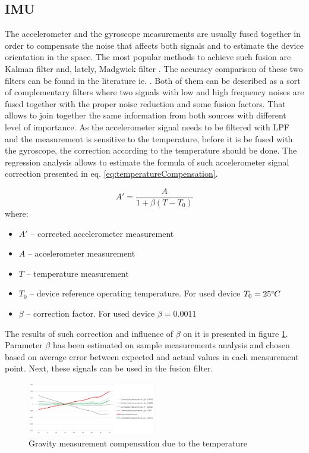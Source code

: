 \documentclass{llncs}
\begin{document}
\subsection{IMU}
The accelerometer and the gyroscope measurements are usually fused together in order to compensate the noise that affects both signals and to estimate the device orientation in the space. The most popular methods to achieve such fusion are Kalman filter \cite{Mccarron2013,Caron2006} and, lately, Madgwick filter \cite{Kalkbrenner2014}. The accuracy comparison of these two filters can be found in the literature ie. \cite{Madgwick2010}. Both of them can be described as a sort of complementary filters where two signals with low and high frequency noises are fused together with the proper noise reduction and some fusion factors. That allows to join together the same information from both sources with different level of importance. As the accelerometer signal needs to be filtered with LPF and the measurement is sensitive to the temperature, before it is be fused with the gyroscope, the correction according to the temperature should be done. The regression analysis allows to estimate the formula of such accelerometer signal correction presented in eq. \eqref{eq:temperatureCompensation}. 

\begin{equation}
	\label{eq:temperatureCompensation}
	A' = \frac{A}{1+\beta(T - T_0)}
\end{equation}
where:
\begin{itemize}
	\item $A'$ -- corrected accelerometer measurement
	\item $A$ -- accelerometer measurement
	\item $T$ -- temperature measurement
	\item $T_0$ -- device reference operating temperature. For used device $T_0 = 25\degree C$
	\item $\beta$ -- correction factor. For used device $\beta = 0.0011$
\end{itemize}

The results of such correction and influence of $\beta$ on it is presented in figure \ref{fig:characteristics:imu:imuTempCompensation}. Parameter $\beta$ has been estimated on sample measurements analysis and chosen based on average error between expected and actual values in each measurement point. Next, these signals can be used in the fusion filter. 

\begin{figure}[h!]
	\centering 
	\includegraphics[width=0.5\textwidth]{Images/temperaure}
	\caption{Gravity measurement compensation due to the temperature}
	\label{fig:characteristics:imu:imuTempCompensation}
\end{figure}
\end{document}
